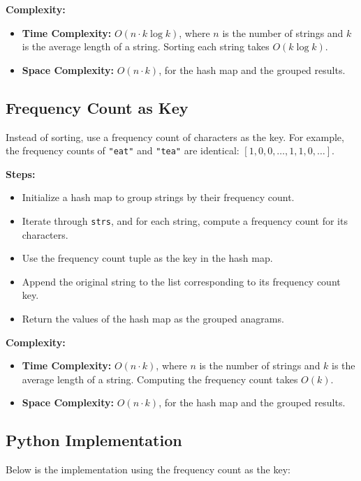 \textbf{Complexity:}
\begin{itemize}
    \item \textbf{Time Complexity:} \(O(n \cdot k \log k)\), where \(n\) is the number of strings and \(k\) is the average length of a string. Sorting each string takes \(O(k \log k)\).
    \item \textbf{Space Complexity:} \(O(n \cdot k)\), for the hash map and the grouped results.
\end{itemize}

\subsection*{Frequency Count as Key}
Instead of sorting, use a frequency count of characters as the key. For example, the frequency counts of \texttt{"eat"} and \texttt{"tea"} are identical: \([1, 0, 0, \dots, 1, 1, 0, \dots]\).

\textbf{Steps:}
\begin{itemize}
    \item Initialize a hash map to group strings by their frequency count.
    \item Iterate through \texttt{strs}, and for each string, compute a frequency count for its characters.
    \item Use the frequency count tuple as the key in the hash map.
    \item Append the original string to the list corresponding to its frequency count key.
    \item Return the values of the hash map as the grouped anagrams.
\end{itemize}

\textbf{Complexity:}
\begin{itemize}
    \item \textbf{Time Complexity:} \(O(n \cdot k)\), where \(n\) is the number of strings and \(k\) is the average length of a string. Computing the frequency count takes \(O(k)\).
    \item \textbf{Space Complexity:} \(O(n \cdot k)\), for the hash map and the grouped results.
\end{itemize}

\subsection*{Python Implementation}
Below is the implementation using the frequency count as the key:

